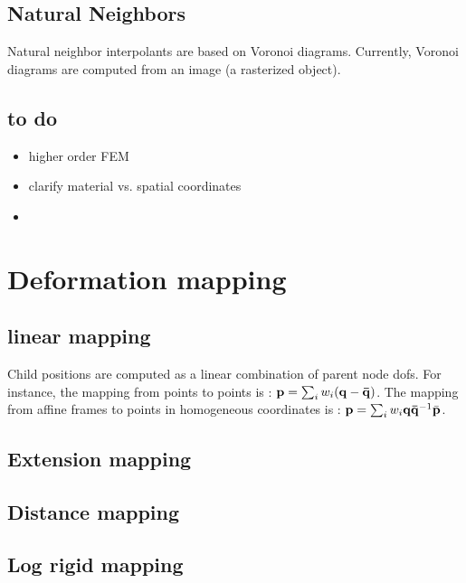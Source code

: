 \subsection{Natural Neighbors}

Natural neighbor interpolants are based on Voronoi diagrams.
Currently, Voronoi diagrams are computed from an image (a rasterized object).

\subsection{to do}

\begin{itemize}
 \item higher order FEM
 \item clarify material vs. spatial coordinates
 \item 
\end{itemize}







\section{Deformation mapping} \label{sec deformation mapping}

\subsection{linear mapping}

Child positions are computed as a linear combination of parent node dofs.
For instance, the mapping from points to points is : $\mathbf{{p}} = \sum_i w_i (\mathbf{{q}} - \mathbf{{\bar{q}}})$.
The mapping from affine frames to points in homogeneous coordinates is : $\mathbf{{p}} = \sum_i w_i \mathbf{{q}} \mathbf{{\bar{q}}}^{-1} \bar{\mathbf{{p}}}$.

\subsection{Extension mapping}

\subsection{Distance mapping}

\subsection{Log rigid mapping}

